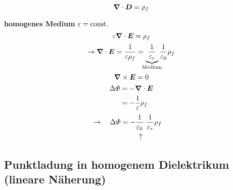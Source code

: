 \begin{equation*}
\bm{\nabla} \cdot \bm{D} = \rho_f
\end{equation*}
\begin{center}
	\begin{minipage}{.5\linewidth}
	\end{minipage}
\end{center}
\textbf{homogenes Medium} $ \varepsilon = \textrm{const.} $
\begin{equation*}
\varepsilon \bm{\nabla} \cdot \bm{E} = \rho_f
\end{equation*}
\begin{equation*}
\rightarrow \vabla \cdot \vec{E} = \frac{1}{\epsilon \rho_f} = \ub{\frac{1}{\epsilon_r}}_{\mathclap{\tx{Medium}}} \frac{1}{\epsilon_0} \rho_f
\end{equation*}
\begin{equation*}
\bm{\nabla} \times \bm{E} = 0
\end{equation*}
\begin{align*}
\Delta \varPhi &= - \bm{\nabla} \cdot \bm{E} \\
&= - \frac{1}{\varepsilon} \rho_f
\end{align*}
\begin{align*}
\rightarrow \quad \Delta \Phi &= - \custo{\leftarrow}{\frac{1}{\epsilon_0}}{} \ \frac{1}{\epsilon_r} \rho_f
\end{align*}

\subsection{Punktladung in homogenem Dielektrikum (lineare Näherung)} %

